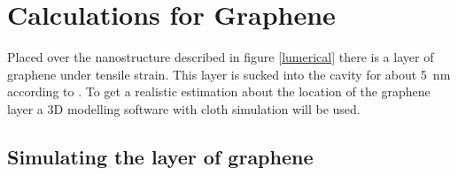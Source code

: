 \newpage
\section{Calculations for Graphene}

Placed over the nanostructure described in figure \ref{lumerical} there is a layer of graphene under tensile strain. This layer is sucked into the cavity for about \SI{5}{nm} according to \cite{heeg}. To get a realistic estimation about the location of the graphene layer a 3D modelling software with cloth simulation will be used.

\subsection{Simulating the layer of graphene}

